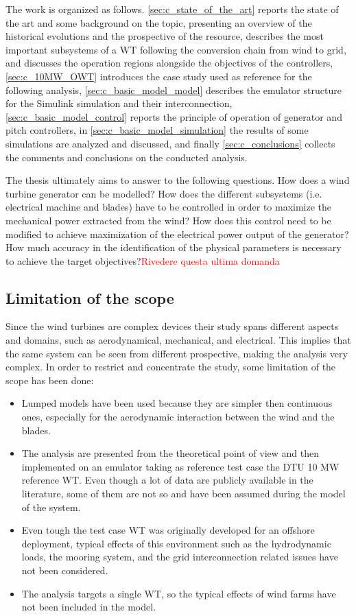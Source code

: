 The work is organized as follows. \autoref{sec:c_state_of_the_art} reports the state of the art and some background on the topic, presenting an overview of the historical evolutions and the prospective of the resource, describes the most important subsystems of a WT following the conversion chain from wind to grid, and discusses the operation regions alongside the objectives of the controllers, \autoref{sec:c_10MW_OWT} introduces the case study used as reference for the following analysis, \autoref{sec:c_basic_model_model} describes the emulator structure for the Simulink simulation and their interconnection, \autoref{sec:c_basic_model_control} reports the principle of operation of generator and pitch controllers, in \autoref{sec:c_basic_model_simulation} the results of some simulations are analyzed and discussed, and finally \autoref{sec:c_conclusions} collects the comments and conclusions on the conducted analysis.

The thesis ultimately aims to answer to the following questions. How does a wind turbine generator can be modelled? How does the different subsystems (i.e. electrical machine and blades) have to be controlled in order to maximize the mechanical power extracted from the wind? How does this control need to be modified to achieve maximization of the electrical power output of the generator?
How much accuracy in the identification of the physical parameters is necessary to achieve the target objectives?\textcolor{red}{Rivedere questa ultima domanda}

\subsection{Limitation of the scope}\label{subsec:limitation_of_scope}
Since the wind turbines are complex devices their study spans different aspects and domains, such as aerodynamical, mechanical, and electrical. This implies that the same system can be seen from different prospective, making the analysis very complex. In order to restrict and concentrate the study, some limitation of the scope has been done:
\begin{itemize}
  \item Lumped models have been used because they are simpler then continuous ones, especially for the aerodynamic interaction between the wind and the blades.
  \item The analysis are presented from the theoretical point of view and then implemented on an emulator taking as reference test case the DTU 10 MW reference \acrfull{WT}. Even though a lot of data are publicly available in the literature, some of them are not so and have been assumed during the model of the system. 
  \item Even tough the test case WT was originally developed for an offshore deployment, typical effects of this environment such as the hydrodynamic loads, the mooring system, and the grid interconnection related issues have not been considered. 
  \item The analysis targets a single WT, so the typical effects of wind farms have not been included in the model. 
\end{itemize}


